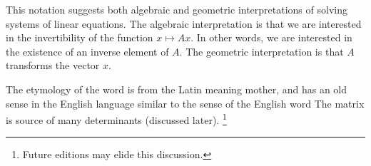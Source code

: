 This notation suggests both algebraic and geometric interpretations of solving systems of linear equations.
The algebraic interpretation is that we are interested in the invertibility of the function $x \mapsto Ax$.
In other words, we are interested in the existence of an inverse element of $A$.
The geometric interpretation is that $A$ transforms the vector $x$.

The etymology of the word  is from the Latin  meaning mother, and has an old sense in the English language similar to the sense of the English word 
The matrix is source of many determinants (discussed later).
  \ifhmode\unskip\fi\footnote{
Future editions may elide this discussion.
  }
